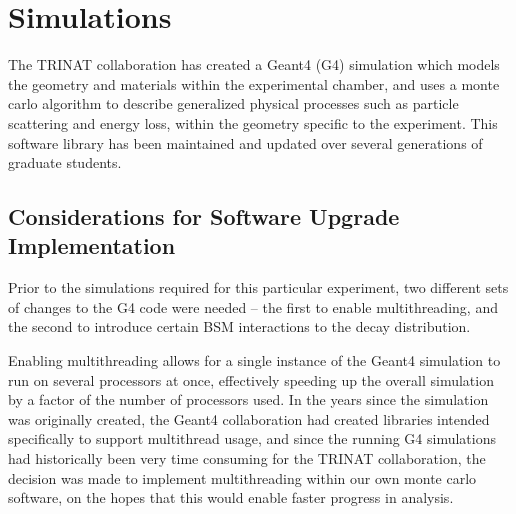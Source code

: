 % 
% 
% 
% 
\chapter{Simulations}
\label{simulations_chapter}


The TRINAT collaboration has created a Geant4 (G4) simulation which models the geometry and materials within the experimental chamber, and uses a monte carlo algorithm to describe generalized physical processes such as particle scattering and energy loss, within the geometry specific to the experiment.  This software library has been maintained and updated over several generations of graduate students.  

\section{Considerations for Software Upgrade Implementation}
\label{sec:software_upgrades}
Prior to the simulations required for this particular experiment, two different sets of changes to the G4 code were needed -- the first to enable multithreading, and the second to introduce certain BSM interactions to the decay distribution.  

Enabling multithreading allows for a single instance of the Geant4 simulation to run on several processors at once, effectively speeding up the overall simulation by a factor of the number of processors used.  In the years since the simulation was originally created, the Geant4 collaboration had created libraries intended specifically to support multithread usage, and since the running G4 simulations had historically been very time consuming for the TRINAT collaboration, the decision was made to implement multithreading within our own monte carlo software, on the hopes that this would enable faster progress in analysis. 

